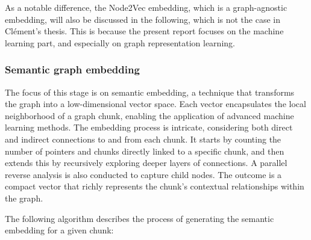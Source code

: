 As a notable difference, the Node2Vec embedding, which is a graph-agnostic embedding, will also be discussed in the following, which is not the case in Clément's thesis. This is because the present report focuses on the machine learning part, and especially on graph representation learning.

\subsubsection{Semantic graph embedding}\label{sec:mem_2_graph:semantic_embedding}

The focus of this stage is on semantic embedding, a technique that transforms the graph into a low-dimensional vector space. Each vector encapsulates the local neighborhood of a graph chunk, enabling the application of advanced machine learning methods. The embedding process is intricate, considering both direct and indirect connections to and from each chunk. It starts by counting the number of pointers and chunks directly linked to a specific chunk, and then extends this by recursively exploring deeper layers of connections. A parallel reverse analysis is also conducted to capture child nodes. The outcome is a compact vector that richly represents the chunk's contextual relationships within the graph.

The following algorithm describes the process of generating the semantic embedding for a given chunk:

